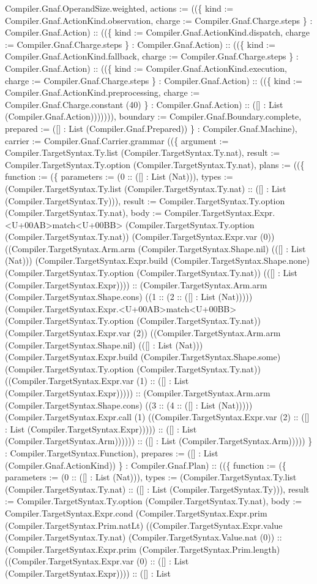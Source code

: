 \documentclass[11pt]{article}
\begin{document}
Compiler.Gnaf.OperandSize.weighted, actions := ((\{ kind := Compiler.Gnaf.ActionKind.observation, charge := Compiler.Gnaf.Charge.steps \} : Compiler.Gnaf.Action) :: ((\{ kind := Compiler.Gnaf.ActionKind.dispatch, charge := Compiler.Gnaf.Charge.steps \} : Compiler.Gnaf.Action) :: ((\{ kind := Compiler.Gnaf.ActionKind.fallback, charge := Compiler.Gnaf.Charge.steps \} : Compiler.Gnaf.Action) :: ((\{ kind := Compiler.Gnaf.ActionKind.execution, charge := Compiler.Gnaf.Charge.steps \} : Compiler.Gnaf.Action) :: ((\{ kind := Compiler.Gnaf.ActionKind.preprocessing, charge := Compiler.Gnaf.Charge.constant (40) \} : Compiler.Gnaf.Action) :: ([] : List (Compiler.Gnaf.Action))))))), boundary := Compiler.Gnaf.Boundary.complete, prepared := ([] : List (Compiler.Gnaf.Prepared)) \} : Compiler.Gnaf.Machine), carrier := Compiler.Gnaf.Carrier.grammar ((\{ argument := Compiler.TargetSyntax.Ty.list (Compiler.TargetSyntax.Ty.nat), result := Compiler.TargetSyntax.Ty.option (Compiler.TargetSyntax.Ty.nat), plans := ((\{ function := (\{ parameters := (0 :: ([] : List (Nat))), types := (Compiler.TargetSyntax.Ty.list (Compiler.TargetSyntax.Ty.nat) :: ([] : List (Compiler.TargetSyntax.Ty))), result := Compiler.TargetSyntax.Ty.option (Compiler.TargetSyntax.Ty.nat), body := Compiler.TargetSyntax.Expr.<U+00AB>match<U+00BB> (Compiler.TargetSyntax.Ty.option (Compiler.TargetSyntax.Ty.nat)) (Compiler.TargetSyntax.Expr.var (0)) ((Compiler.TargetSyntax.Arm.arm (Compiler.TargetSyntax.Shape.nil) (([] : List (Nat))) (Compiler.TargetSyntax.Expr.build (Compiler.TargetSyntax.Shape.none) (Compiler.TargetSyntax.Ty.option (Compiler.TargetSyntax.Ty.nat)) (([] : List (Compiler.TargetSyntax.Expr)))) :: (Compiler.TargetSyntax.Arm.arm (Compiler.TargetSyntax.Shape.cons) ((1 :: (2 :: ([] : List (Nat))))) (Compiler.TargetSyntax.Expr.<U+00AB>match<U+00BB> (Compiler.TargetSyntax.Ty.option (Compiler.TargetSyntax.Ty.nat)) (Compiler.TargetSyntax.Expr.var (2)) ((Compiler.TargetSyntax.Arm.arm (Compiler.TargetSyntax.Shape.nil) (([] : List (Nat))) (Compiler.TargetSyntax.Expr.build (Compiler.TargetSyntax.Shape.some) (Compiler.TargetSyntax.Ty.option (Compiler.TargetSyntax.Ty.nat)) ((Compiler.TargetSyntax.Expr.var (1) :: ([] : List (Compiler.TargetSyntax.Expr))))) :: (Compiler.TargetSyntax.Arm.arm (Compiler.TargetSyntax.Shape.cons) ((3 :: (4 :: ([] : List (Nat))))) (Compiler.TargetSyntax.Expr.call (1) ((Compiler.TargetSyntax.Expr.var (2) :: ([] : List (Compiler.TargetSyntax.Expr))))) :: ([] : List (Compiler.TargetSyntax.Arm)))))) :: ([] : List (Compiler.TargetSyntax.Arm))))) \} : Compiler.TargetSyntax.Function), prepares := ([] : List (Compiler.Gnaf.ActionKind)) \} : Compiler.Gnaf.Plan) :: ((\{ function := (\{ parameters := (0 :: ([] : List (Nat))), types := (Compiler.TargetSyntax.Ty.list (Compiler.TargetSyntax.Ty.nat) :: ([] : List (Compiler.TargetSyntax.Ty))), result := Compiler.TargetSyntax.Ty.option (Compiler.TargetSyntax.Ty.nat), body := Compiler.TargetSyntax.Expr.cond (Compiler.TargetSyntax.Expr.prim (Compiler.TargetSyntax.Prim.natLt) ((Compiler.TargetSyntax.Expr.value (Compiler.TargetSyntax.Ty.nat) (Compiler.TargetSyntax.Value.nat (0)) :: (Compiler.TargetSyntax.Expr.prim (Compiler.TargetSyntax.Prim.length) ((Compiler.TargetSyntax.Expr.var (0) :: ([] : List (Compiler.TargetSyntax.Expr)))) :: ([] : List 
\end{document}

